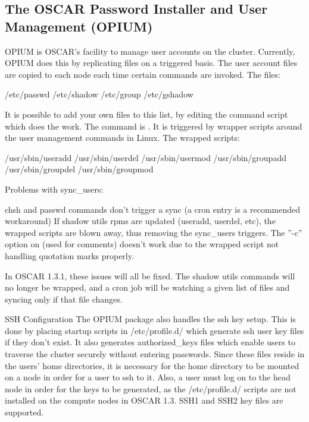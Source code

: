 %
%
%

\subsection{The OSCAR Password Installer and User Management (OPIUM)}
\label{app:opium-overview}

OPIUM is OSCAR's facility to manage user accounts on the cluster.  Currently,
OPIUM does this by replicating files on a triggered basis.  The user account
files are copied to each node each time certain commands are invoked.
The files:
\begin{itemize}
/etc/passwd
/etc/shadow
/etc/group
/etc/gshadow
\end{itemize}
It is possible to add your own files to this list, by editing the command
script which does the work.
The command is .  It is triggered by wrapper
scripts around the user management commands in Linux.  The wrapped scripts:
\begin{itemize}
/usr/sbin/useradd
/usr/sbin/userdel
/usr/sbin/usermod
/usr/sbin/groupadd
/usr/sbin/groupdel
/usr/sbin/groupmod
\end{itemize}

Problems with sync_users:
\begin{itemize}
chsh and passwd commands don't trigger a sync (a cron entry is a recommended
workaround)
If shadow utils rpms are updated (useradd, userdel, etc), the wrapped scripts
are blown away, thus removing the sync_users triggers.
The ''-c'' option on (used for comments) doesn't work due to
the wrapped script not handling quotation marks properly.
\end{itemize}
In OSCAR 1.3.1, these issues will all be fixed.  The shadow utils commands
will no longer be wrapped, and a cron job will be watching a given list of
files and syncing only if that file changes.

SSH Configuration
The OPIUM package also handles the ssh key setup.  This is done by placing
startup scripts in /etc/profile.d/ which generate ssh user key files if 
they don't exist.  It also generates authorized_keys files which enable
users to traverse the cluster securely without entering passwords.  Since
these files reside in the users' home directories, it is necessary for
the home directory to be mounted on a node in order for a user to ssh to
it.  Also, a user must log on to the head node in order for the keys to
be generated, as the /etc/profile.d/ scripts are not installed on the
compute nodes in OSCAR 1.3.  SSH1 and SSH2 key files are supported.  



